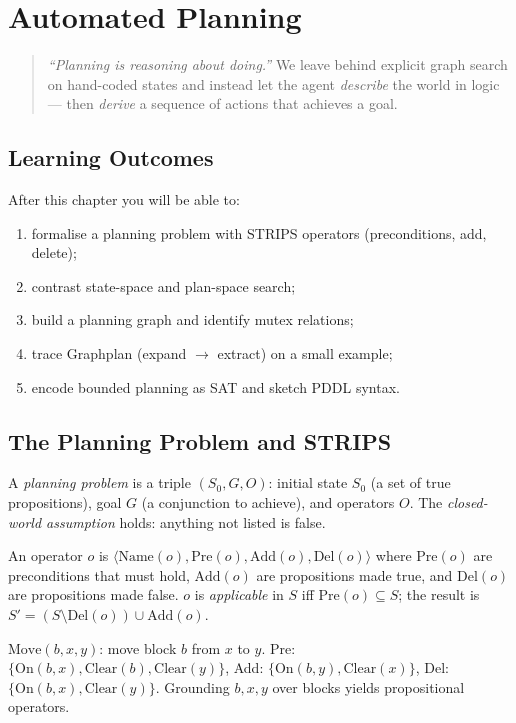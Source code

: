 \chapter{Automated Planning}
\label{ch:planning}
\begin{quote}
\emph{``Planning is reasoning about doing.''} We leave behind explicit graph search on hand-coded states and instead let the agent \emph{describe} the world in logic --- then \emph{derive} a sequence of actions that achieves a goal.
\end{quote}
\noindent{}
\vspace{0.4em}
\section*{Learning Outcomes}
After this chapter you will be able to:
\begin{enumerate}[label=(L\arabic*)]
    \item formalise a planning problem with STRIPS operators (preconditions, add, delete);
    \item contrast state-space and plan-space search;
    \item build a planning graph and identify mutex relations;
    \item trace Graphplan (expand $\to$ extract) on a small example;
    \item encode bounded planning as SAT and sketch PDDL syntax.
\end{enumerate}
\section{The Planning Problem and STRIPS}
\label{sec:strips}
A \emph{planning problem} is a triple $(S_0, G, O)$: initial state $S_0$ (a set of true propositions), goal $G$ (a conjunction to achieve), and operators $O$. The \emph{closed-world assumption} holds: anything not listed is false.
\begin{definition}
An operator $o$ is $\langle \text{Name}(o), \text{Pre}(o), \text{Add}(o), \text{Del}(o)\rangle$ where $\text{Pre}(o)$ are preconditions that must hold, $\text{Add}(o)$ are propositions made true, and $\text{Del}(o)$ are propositions made false. $o$ is \emph{applicable} in $S$ iff $\text{Pre}(o)\subseteq S$; the result is $S'=(S\setminus\text{Del}(o))\cup\text{Add}(o)$.
\end{definition}
\begin{example}
$\text{Move}(b,x,y)$: move block $b$ from $x$ to $y$. Pre: $\{\text{On}(b,x),\text{Clear}(b),\text{Clear}(y)\}$, Add: $\{\text{On}(b,y),\text{Clear}(x)\}$, Del: $\{\text{On}(b,x),\text{Clear}(y)\}$. Grounding $b,x,y$ over blocks yields propositional operators.
\end{example}

